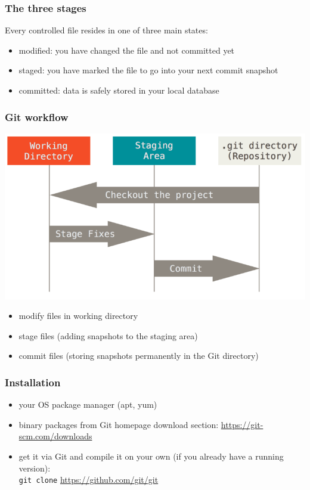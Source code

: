 \documentclass{beamer}
\begin{document}
\begin{frame}
  \frametitle{The three stages}
  Every controlled file resides in one of three main states:
  \begin{itemize}
    \item modified: you have changed the file and not committed yet
    \item staged: you have marked the file to go into your next commit snapshot
    \item committed: data is safely stored in your local database
  \end{itemize}
\end{frame}

\begin{frame}
  \frametitle{Git workflow}
  \centering
  \includegraphics[width=.9\textwidth]{areas}
  \begin{itemize}
    \item modify files in working directory
    \item stage files (adding snapshots to the staging area)
    \item commit files (storing snapshots permanently in the Git directory)
  \end{itemize}
\end{frame}

\begin{frame}[fragile]
  \frametitle{Installation}
  \begin{itemize}
    \item your OS package manager (apt, yum)
    \item binary packages from Git homepage download section: \url{https://git-scm.com/downloads}
    \item get it via Git and compile it on your own (if you already have a running version):\\ 
      \lstinline{git clone} \url{https://github.com/git/git}
  \end{itemize}
\end{frame}
\end{document}
